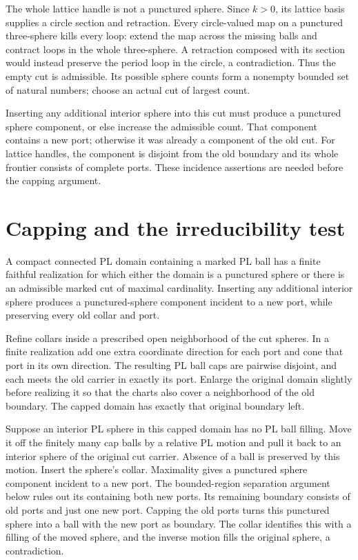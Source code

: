 The whole lattice handle is not a punctured sphere. Since $k>0$, its
lattice basis supplies a circle section and retraction. Every circle-valued
map on a punctured three-sphere kills every loop: extend the map across
the missing balls and contract loops in the whole three-sphere. A
retraction composed with its section would instead preserve the period
loop in the circle, a contradiction. Thus the empty cut is admissible.
Its possible sphere counts form a nonempty bounded set of natural numbers;
choose an actual cut of largest count.

Inserting any additional interior sphere into this cut must produce a
punctured sphere component, or else increase the admissible count. That
component contains a new port; otherwise it was already a component of
the old cut. For lattice handles, the component is disjoint from the old
boundary and its whole frontier consists of complete ports. These
incidence assertions are needed before the capping argument.

\section{Capping and the irreducibility test}
\label{sec:prime-capping}

\begin{theorem}
\label{thm:prime-maximal-cut}
A compact connected PL domain containing a marked PL ball has a finite
faithful realization for which either the domain is a punctured sphere
or there is an admissible marked cut of maximal cardinality. Inserting
any additional interior sphere produces a punctured-sphere component
incident to a new port, while preserving every old collar and port.
\end{theorem}

Refine collars inside a prescribed open neighborhood of the cut spheres.
In a finite realization add one extra coordinate direction for each port
and cone that port in its own direction. The resulting PL ball caps are
pairwise disjoint, and each meets the old carrier in exactly its port.
Enlarge the original domain slightly before realizing it so that the
charts also cover a neighborhood of the old boundary. The capped domain
has exactly that original boundary left.

Suppose an interior PL sphere in this capped domain has no PL ball
filling. Move it off the finitely many cap balls by a relative PL motion
and pull it back to an interior sphere of the original cut carrier.
Absence of a ball is preserved by this motion. Insert the sphere's
collar. Maximality gives a punctured sphere component incident to a new
port. The bounded-region separation argument below rules out its containing
both new ports. Its remaining boundary consists of old ports and just one new
port. Capping the old ports turns this punctured sphere into a ball with
the new port as boundary. The collar identifies this with a filling of
the moved sphere, and the inverse motion fills the original sphere,
a contradiction.

